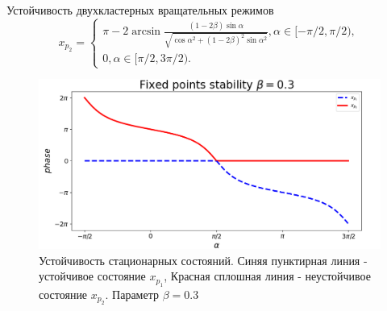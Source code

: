 \begin{chapter}{Устойчивость двухкластерных вращательных режимов}
	\begin{equation} \label{x2}
	x_{p_2} = \begin{cases}
		\pi - 2\arcsin{\frac{(1 - 2\beta) \sin{\alpha}}{\sqrt{\cos{\alpha}^2 + (1 - 2\beta)^2\sin{\alpha}^2}}}, \alpha \in [-\pi/2, \pi/2), \\
		0, \alpha \in [\pi/2, 3\pi/2).
		\end{cases}
	\end{equation}
	\begin{figure}[h!]\center		
		\includegraphics[width=1\columnwidth]{pictures/fixed-points.png} 
		\caption{Устойчивость стационарных состояний.
		Синяя пунктирная линия - устойчивое состояние $x_{p_1}$,
		Красная сплошная линия - неустойчивое состояние $x_{p_2}$.
		Параметр $\beta = 0.3$}
		\label{fp-2}
	\end{figure}


\end{chapter}

